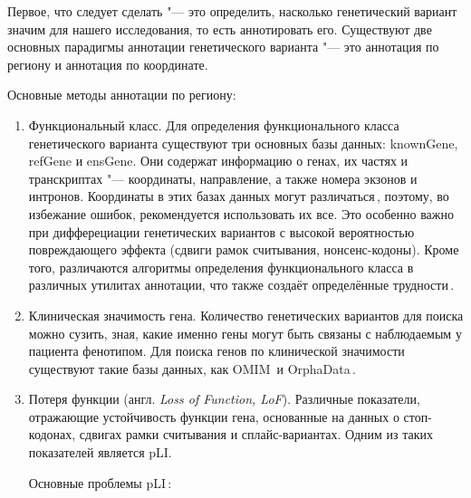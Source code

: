 \documentclass[a4paper,14pt]{extarticle}
\newcommand{\engterm}[1]{англ. \textenglish{\textit{#1}}}
\begin{document}
Первое, что следует сделать "--- это определить, насколько генетический вариант значим для нашего исследования, то есть аннотировать его.
Существуют две основных парадигмы аннотации генетического варианта "--- это аннотация по региону и аннотация по координате.

Основные методы аннотации по региону:

\begin{enumerate}
	\item Функциональный класс.
	      Для определения функционального класса генетического варианта существуют три основных базы данных: knownGene, refGene и ensGene.
	      Они содержат информацию о генах, их частях и транскриптах "--- координаты, направление, а также номера экзонов и интронов.
	      Координаты в этих базах данных могут различаться\,\citep{McCarthy_2014}, поэтому, во избежание ошибок, рекомендуется использовать их все.
	      Это особенно важно при дифферециации генетических вариантов с высокой вероятностью повреждающего эффекта (сдвиги рамок считывания, нонсенс-кодоны).
	      Кроме того, различаются алгоритмы определения функционального класса в различных утилитах аннотации, что также создаёт определённые трудности\,\citep{Jesaitis_2014}.

	\item Клиническая значимость гена.
	      Количество генетических вариантов для поиска можно сузить, зная, какие именно гены могут быть связаны с наблюдаемым у пациента фенотипом.
	      Для поиска генов по клинической значимости существуют такие базы данных, как OMIM\,\citep{Amberger_2014} и OrphaData\,\citep{Orphanet}.

	\item Потеря функции (\engterm{Loss of Function, LoF}).
	      Различные показатели, отражающие устойчивость функции гена, основанные на данных о стоп-кодонах, сдвигах рамки считывания и сплайс-вариантах.
	      Одним из таких показателей является pLI.

	      Основные проблемы pLI\,\citep{Ziegler_2019}:


\end{enumerate}
\end{document}
